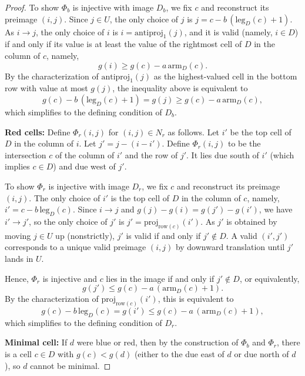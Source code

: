 \documentclass[11pt,reqno]{amsart}
\theoremstyle{remark}
\begin{document}
\begin{proof}
    To show $\Phi_b$ is injective with image $D_b$, we fix $c$ and reconstruct its preimage $(i,j)$. Since $j\in U$, the only choice of $j$ is $j=c-b\,(\mathrm{leg}_D(c)+1)$. As $i\to j$, the only choice of $i$ is $i=\mathrm{antiproj}_1(j)$, and it is valid (namely, $i\in D$) if and only if its value is at least the value of the rightmost cell of $D$ in the column of $c$, namely,
    \[ g(i)\geq g(c)-a\,\mathrm{arm}_D(c).\]
    By the characterization of $\mathrm{antiproj}_1(j)$ as the highest-valued cell in the bottom row with value at most $g(j)$, the inequality above is equivalent to
    \[ g(c)-b\,(\mathrm{leg}_D(c)+1) = g(j)\geq g(c)-a\,\mathrm{arm}_D(c), \]
    which simplifies to the defining condition of $D_b$.

    \medskip
    \noindent\textbf{Red cells:} Define $\Phi_r(i,j)$ for $(i,j)\in N_r$ as follows. Let $i'$ be the top cell of $D$ in the column of $i$. Let $j'=j-(i-i')$. Define $\Phi_r(i,j)$ to be the intersection $c$ of the column of $i'$ and the row of $j'$. It lies due south of $i'$ (which implies $c\in D$) and due west of $j'$. 

    To show $\Phi_r$ is injective with image $D_r$, we fix $c$ and reconstruct its preimage $(i,j)$. The only choice of $i'$ is the top cell of $D$ in the column of $c$, namely, $i'=c-b\,\mathrm{leg}_D(c)$. Since $i\to j$ and $g(j)-g(i)=g(j')-g(i')$, we have $i'\to j'$, so the only choice of $j'$ is $j'=\mathrm{proj}_{\mathrm{row}(c)}(i')$. As $j'$ is obtained by moving $j\in U$ up (nonstrictly), $j'$ is valid if and only if $j'\notin D$. A valid $(i',j')$ corresponds to a unique valid preimage $(i,j)$ by downward translation until $j'$ lands in $U$. 

    Hence, $\Phi_r$ is injective and $c$ lies in the image if and only if $j'\notin D$, or equivalently,
    \[ g(j')\leq g(c)-a\,(\mathrm{arm}_D(c)+1).\]
    By the characterization of $\mathrm{proj}_{\mathrm{row}(c)}(i')$, this is equivalent to
    \[g(c)-b\,\mathrm{leg}_D(c)=g(i')\leq g(c)-a\,(\mathrm{arm}_D(c)+1),\]
    which simplifies to the defining condition of $D_r$.

    \medskip
    \noindent\textbf{Minimal cell: } If $d$ were blue or red, then by the construction of $\Phi_b$ and $\Phi_r$, there is a cell $c\in D$ with $g(c)<g(d)$ (either to the due east of $d$ or due north of $d$), so $d$ cannot be minimal.
\end{proof}


\vspace{0.5em}
\end{document}
